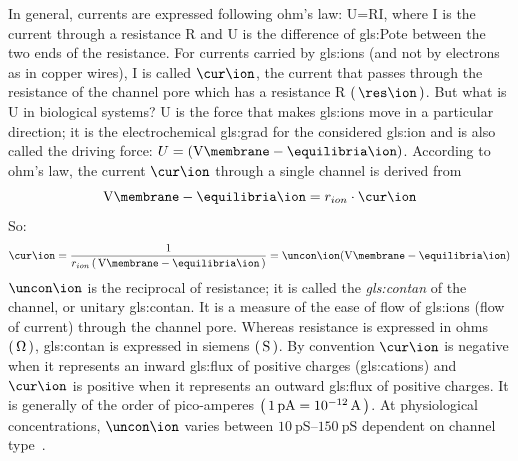 \documentclass[class={.NoTouch/myProject}, crop=false]{standalone}
\begin{document}
In general, currents are expressed following ohm's law: U=RI, where I is the current through a resistance R and U is the difference of \gls{gls:Pote} between the two ends of the resistance. For currents carried by \glspl{gls:ion} (and not by electrons as in copper wires), I is called  \(\unit{\cur\ion}\), the current that passes through the resistance of the channel pore which has a resistance R \(\br{\unit{\res\ion}}\). But what is U in biological systems? U is the force that makes \glspl{gls:ion} move in a particular direction; it is the electrochemical \gls{gls:grad} for the considered \gls{gls:ion} and is also called the driving force: \(U=(\unit{\V\membrane} - \unit{\equilibria\ion})\). According to ohm's law, the current \(\unit{\cur\ion}\) through a single channel is derived from 
\begin{equation}
    \unit{\V\membrane} - \unit{\equilibria\ion} = r_{ion} \cdot \unit{\cur\ion}
\end{equation}
So:
\begin{equation}
    \unit{\cur\ion} = \frac{1}{r_{ion}\br{\unit{\V\membrane} - \unit{\equilibria\ion}}} = \unit{\uncon\ion}(\unit{\V\membrane} - \unit{\equilibria\ion})
\end{equation}
\(\unit{\uncon\ion}\) is the reciprocal of resistance; it is called the \textit{\gls{gls:contan}} of the channel, or unitary \gls{gls:contan}. It is a measure of the ease of flow of \glspl{gls:ion} (flow of current) through the channel pore. Whereas resistance is expressed in ohms \(\br{\unit{\ohm}}\), \gls{gls:contan} is expressed in siemens \(\br{\unit{\siemens}}\). By convention \(\unit{\cur\ion} \) is negative when it represents an inward \gls{gls:flux} of positive charges (\glspl{gls:cation}) and \(\unit{\cur\ion}\) is positive when it represents an outward \gls{gls:flux} of positive charges. It is generally of the order of pico-amperes \(\br{\qty{1}{\pico\ampere}=\qty{e-12}{\ampere}}\). At physiological concentrations, \(\unit{\uncon\ion}\) varies between \(\qtyrange{10}{150}{\pico\siemens}\) dependent on channel type~\cite{}.
\end{document}
